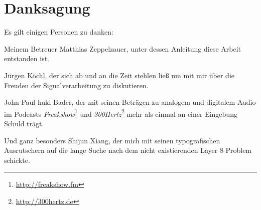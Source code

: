 \chapter*{Danksagung}

\noindent Es gilt einigen Personen zu danken:

\vspace{6mm}

\noindent Meinem Betreuer Matthias Zeppelzauer, unter dessen Anleitung diese Arbeit entstanden ist.

\vspace{6mm}

\noindent J\"urgen K\"ochl, der sich ab und an die Zeit stehlen lie{\ss} um mit mir über die Freuden der Signalverarbeitung zu diskutieren.

\vspace{6mm}

\noindent John-Paul \glqq hukl\grqq{} Bader, der mit seinen Betr\"agen zu analogem und digitalem Audio im Podcasts \emph{Freakshow}\footnote{\url{http://freakshow.fm}} und \textit{300Hertz}\footnote{\url{http://300hertz.de}} mehr als einmal an einer Eingebung Schuld tr\"agt. 

\vspace{6mm}

\noindent Und ganz besonders Shijun Xiang, der mich mit seinen typografischen Ausrutschern auf die lange Suche nach dem nicht existierenden Layer 8 Problem schickte.   